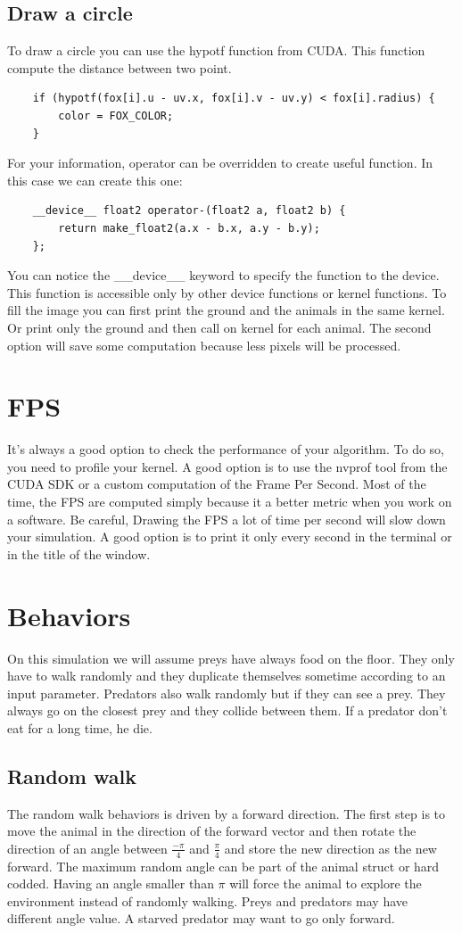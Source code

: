 \documentclass{article}
\begin{document}
\subsection{Draw a circle}
To draw a circle you can use the hypotf function from CUDA. This function compute the distance between two point. 
\begin{lstlisting}
	if (hypotf(fox[i].u - uv.x, fox[i].v - uv.y) < fox[i].radius) {
		color = FOX_COLOR;
	}
\end{lstlisting}
For your information, operator can be overridden to create useful function. In this case we can create this one:
\begin{lstlisting}
	__device__ float2 operator-(float2 a, float2 b) {
		return make_float2(a.x - b.x, a.y - b.y);
	};
\end{lstlisting}
You can notice the \_\_device\_\_ keyword to specify the function to the device. This function is accessible only by other device functions or kernel functions. To fill the image you can first print the ground and the animals in the same kernel. Or print only the ground and then call on kernel for each animal. The second option will save some computation because less pixels will be processed. 

\section{FPS}
It's always a good option to check the performance of your algorithm. To do so, you need to profile your kernel. A good option is to use the nvprof tool from the CUDA SDK or a custom computation of the Frame Per Second. Most of the time, the FPS are computed simply because it a better metric when you work on a software. Be careful, Drawing the FPS a lot of time per second will slow down your simulation. A good option is to print it only every second in the terminal or in the title of the window.

\section{Behaviors}
On this simulation we will assume preys have always food on the floor. They only have to walk randomly and they duplicate themselves sometime according to an input parameter. Predators also walk randomly but if they can see a prey. They always go on the closest prey and they collide between them. If a predator don't eat for a long time, he die.

\subsection{Random walk}
The random walk behaviors is driven by a forward direction. The first step is to move the animal in the direction of the forward vector and then rotate the direction of an angle between $\frac{-\pi}{4}$ and $\frac{\pi}{4}$ and store the new direction as the new forward. The maximum random angle can be part of the animal struct or hard codded. Having an angle smaller than $\pi$ will force the animal to explore the environment instead of randomly walking. Preys and predators may have different angle value. A starved predator may want to go only forward.
\end{document}
